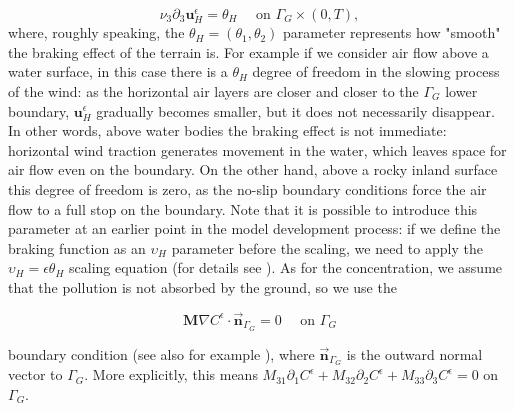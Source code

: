 \documentclass[11pt]{article}
\begin{document}
\begin{itemize}
    \begin{equation}
      \nu_3 \partial_3 \mathbf{u}^\epsilon_H = \theta_H \quad \text{ on } \Gamma_G \times (0,T),
    \end{equation}
%
where, roughly speaking, the $\theta_H = (\theta_1, \theta_2)$ parameter represents how "smooth" the braking effect of the terrain is. For example if we consider air flow above a water surface, in this case there is a $\theta_H$ degree of freedom in the slowing process of the wind: as the horizontal air layers are closer and closer to the $\Gamma_G$ lower boundary, $\mathbf{u}_H^\epsilon$ gradually becomes smaller, but it does not necessarily disappear. In other words, above water bodies the braking effect is not immediate: horizontal wind traction generates movement in the water, which leaves space for air flow even on the boundary. On the other hand, above a rocky inland surface this degree of freedom is zero, as the no-slip boundary conditions force the air flow to a full stop on the boundary. Note that it is possible to introduce this parameter at an earlier point in the model development process: if we define the braking function as an $\upsilon_H$ parameter before the scaling, we need to apply the $\upsilon_H = \epsilon \theta_H$ scaling equation (for details see \cite{azerad2001mathematical}). As for the concentration, we assume that the pollution is not absorbed by the ground, so we use the
    
    $$\mathbf{M} \nabla C^\epsilon \cdot \vec{\boldsymbol{n}}_{\Gamma_G} = 0 \quad \text{ on } \Gamma_G$$
    
    boundary condition (see also for example \cite{yeh1975three}), where $\vec{\boldsymbol{n}}_{\Gamma_G}$ is the outward normal vector to $\Gamma_G$. More explicitly, this means $M_{31}\partial_1 C^\epsilon + M_{32} \partial_2 C^\epsilon + M_{33} \partial_3 C^\epsilon = 0$ on $\Gamma_G.$
  
\end{itemize}
\end{document}
